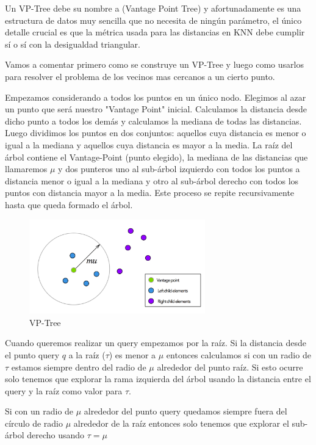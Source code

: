 Un VP-Tree debe su nombre a (Vantage Point Tree) y afortunadamente es una estructura de datos muy sencilla que no necesita de ningún parámetro, el único detalle crucial es que la métrica usada para las distancias en KNN debe cumplir sí o sí con la desigualdad triangular.

Vamos a comentar primero como se construye un VP-Tree y luego como usarlos para resolver el problema de los vecinos mas cercanos a un cierto punto.

Empezamos considerando a todos los puntos en un único nodo. Elegimos al azar un punto que será nuestro "Vantage Point" inicial. Calculamos la distancia desde dicho punto a todos los demás y calculamos la mediana de todas las distancias. Luego dividimos los puntos en dos conjuntos: aquellos cuya distancia es menor o igual a la mediana y aquellos cuya distancia es mayor a la media. La raíz del árbol contiene el Vantage-Point (punto elegido), la mediana de las distancias que llamaremos $\mu$ y dos punteros uno al sub-árbol izquierdo con todos los puntos a distancia menor o igual a la mediana y otro al sub-árbol derecho con todos los puntos con distancia mayor a la media. Este proceso se repite recursivamente hasta que queda formado el árbol. 

\begin{figure}[!htb]
\centering
\includegraphics[width=3in]{figures/vptree.png}

\caption{VP-Tree}
\label{fig:vptree}
\end{figure}

Cuando queremos realizar un query empezamos por la raíz. Si la distancia desde el punto query $q$ a la raíz ($\tau$) es menor a $\mu$ entonces calculamos si con un radio de $\tau$ estamos siempre dentro del radio de $\mu$ alrededor del punto raíz. Si esto ocurre solo tenemos que explorar la rama izquierda del árbol usando la distancia entre el query y la raíz como valor para $\tau$. 

Si con un radio de $\mu$ alrededor del punto query quedamos siempre fuera del círculo de radio $\mu$ alrededor de la raíz entonces solo tenemos que explorar el sub-árbol derecho usando $\tau=\mu$


